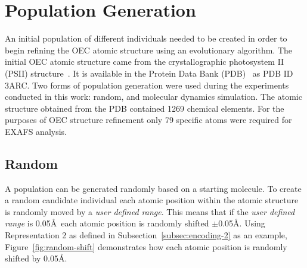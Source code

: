 \section{Population Generation}
\label{sec:pop-generation}

An initial population of different individuals needed to be created in order to begin refining the OEC atomic structure using an evolutionary algorithm. The initial OEC atomic structure came from the crystallographic photosystem II (PSII) structure~\cite{umena2011crystal}. It is available in the Protein Data Bank (PDB)~\cite{databank} as PDB ID 3ARC. Two forms of population generation were used during the experiments conducted in this work: random, and molecular dynamics simulation. The atomic structure obtained from the PDB contained 1269 chemical elements. For the purposes of OEC structure refinement only 79 specific atoms were required for EXAFS analysis.


\subsection{Random}
\label{subsec:random-population}

A population can be generated randomly based on a starting molecule. To create a random candidate individual each atomic position within the atomic structure is randomly moved by a \textit{user defined range}. This means that if the \textit{user defined range} is 0.05\AA\ each atomic position is randomly shifted $\pm$0.05\AA. Using Representation 2 as defined in Subsection~\ref{subsec:encoding-2} as an example, Figure~\ref{fig:random-shift} demonstrates how each atomic position is randomly shifted by 0.05\AA.

